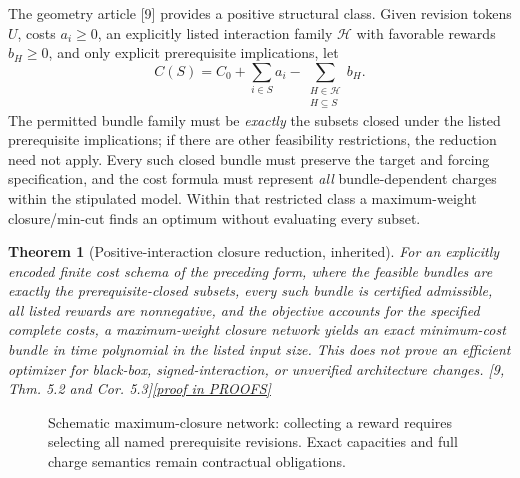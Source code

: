 \documentclass[11pt,letterpaper]{article}
\newtheorem{theorem}{Theorem}[section]
\theoremstyle{definition}
\theoremstyle{remark}
\newcommand{\prooflink}[1]{\hfill\hyperlink{proof:#1}{\footnotesize[proof in PROOFS]}}
\newcommand{\src}[1]{\textup{[#1]}}
\begin{document}
The geometry article \src{9} provides a positive structural class. Given revision tokens $U$, costs $a_i\geq0$, an explicitly listed interaction family $\mathcal H$ with favorable rewards $b_H\geq0$, and only explicit prerequisite implications, let
\[
 C(S)=C_0+\sum_{i\in S}a_i-\sum_{\substack{H\in\mathcal H\\H\subseteq S}}b_H.
\]
The permitted bundle family must be \emph{exactly} the subsets closed under the listed prerequisite implications; if there are other feasibility restrictions, the reduction need not apply. Every such closed bundle must preserve the target and forcing specification, and the cost formula must represent \emph{all} bundle-dependent charges within the stipulated model. Within that restricted class a maximum-weight closure/min-cut finds an optimum without evaluating every subset.

\begin{theorem}[Positive-interaction closure reduction, inherited]\label{thm:closure}\hypertarget{claim:closure}{}
For an explicitly encoded finite cost schema of the preceding form, where the feasible bundles are \emph{exactly} the prerequisite-closed subsets, every such bundle is certified admissible, all listed rewards are nonnegative, and the objective accounts for the specified complete costs, a maximum-weight closure network yields an exact minimum-cost bundle in time polynomial in the \emph{listed} input size. This does not prove an efficient optimizer for black-box, signed-interaction, or unverified architecture changes. \src{9, Thm. 5.2 and Cor. 5.3}\prooflink{closure}
\end{theorem}

\begin{figure}[htbp]\centering
{}
\caption{Schematic maximum-closure network: collecting a reward requires selecting all named prerequisite revisions. Exact capacities and full charge semantics remain contractual obligations.}\end{figure}
\end{document}
